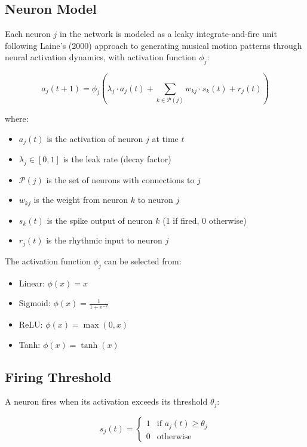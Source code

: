 \documentclass[11pt,a4paper]{article}
\begin{document}
\subsection{Neuron Model}

Each neuron $j$ in the network is modeled as a leaky integrate-and-fire unit following Laine's (2000) \cite{laine2000} approach to generating musical motion patterns through neural activation dynamics, with activation function $\phi_j$:

\begin{equation}
a_j(t+1) = \phi_j\left(\lambda_j \cdot a_j(t) + \sum_{k \in \mathcal{P}(j)} w_{kj} \cdot s_k(t) + r_j(t)\right)
\end{equation}

\noindent where:
\begin{itemize}
\item $a_j(t)$ is the activation of neuron $j$ at time $t$
\item $\lambda_j \in [0,1]$ is the leak rate (decay factor)
\item $\mathcal{P}(j)$ is the set of neurons with connections to $j$
\item $w_{kj}$ is the weight from neuron $k$ to neuron $j$
\item $s_k(t)$ is the spike output of neuron $k$ (1 if fired, 0 otherwise)
\item $r_j(t)$ is the rhythmic input to neuron $j$
\end{itemize}

The activation function $\phi_j$ can be selected from:
\begin{itemize}
\item Linear: $\phi(x) = x$
\item Sigmoid: $\phi(x) = \frac{1}{1 + e^{-x}}$
\item ReLU: $\phi(x) = \max(0, x)$
\item Tanh: $\phi(x) = \tanh(x)$
\end{itemize}

\subsection{Firing Threshold}

A neuron fires when its activation exceeds its threshold $\theta_j$:

\begin{equation}
s_j(t) = \begin{cases} 
1 & \text{if } a_j(t) \geq \theta_j \\
0 & \text{otherwise}
\end{cases}
\end{equation}
\end{document}
